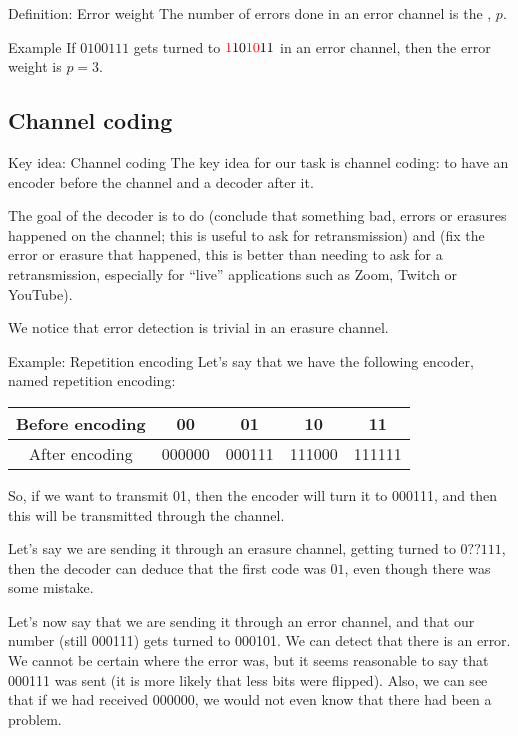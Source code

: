 \documentclass[a4paper]{article}
\begin{document}
\begin{parag}{Definition: Error weight}
    The number of errors done in an error channel is the , $p$.

    \begin{subparag}{Example}
        If $0100111$ gets turned to ${\color{red}1}10{\color{red}10}11$ in an error channel, then the error weight is $p = 3$.
    \end{subparag}
\end{parag}

\subsection{Channel coding}


\begin{parag}{Key idea: Channel coding}
    The key idea for our task is channel coding: to have an encoder before the channel and a decoder after it.

    The goal of the decoder is to do  (conclude that something bad, errors or erasures happened on the channel; this is useful to ask for retransmission) and  (fix the error or erasure that happened, this is better than needing to ask for a retransmission, especially for ``live'' applications such as Zoom, Twitch or YouTube).

    We notice that error detection is trivial in an erasure channel.

\end{parag}

\begin{parag}{Example: Repetition encoding}
    Let's say that we have the following encoder, named repetition encoding:
    \begin{center}
    \begin{tabular}{c|cccc}
        Before encoding & 00 & 01 & 10 & 11 \\
        \hline
        After encoding & 000000 & 000111 & 111000 & 111111
    \end{tabular}
    \end{center}
    
    So, if we want to transmit 01, then the encoder will turn it to 000111, and then this will be transmitted through the channel.

    Let's say we are sending it through an erasure channel, getting turned to $0??111$, then the decoder can deduce that the first code was $01$, even though there was some mistake.

    Let's now say that we are sending it through an error channel, and that our number (still 000111) gets turned to 000101. We can detect that there is an error. We cannot be certain where the error was, but it seems reasonable to say that 000111 was sent (it is more likely that less bits were flipped). Also, we can see that if we had received 000000, we would not even know that there had been a problem. 
\end{parag}
\end{document}

